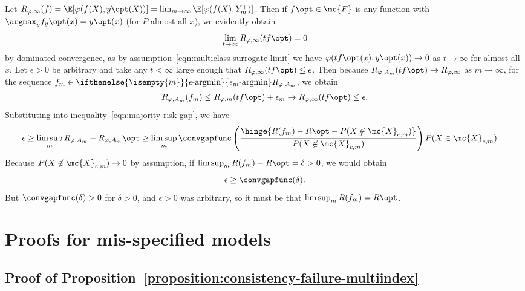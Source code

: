 \documentclass[11pt]{article}
\newcommand{\sloss}{\varphi}  %
\newcommand{\epsargmin}[1][]{
  \ifthenelse{\isempty{#1}}{%
    \mathop{\epsilon\textup{-argmin}}
  }{%
    \mathop{\epsilon_{#1}\textup{-argmin}}
  }
}
\begin{document}
Let $R_{\sloss,\infty}(f) = \E[\sloss(f(X), y\opt(X))]
= \lim_{m \to \infty} \E[\sloss(f(X), Y_m^+)]$.
%
Then if $f\opt \in \mc{F}$ is any
function with $\argmax_y f_y\opt(x) = y\opt(x)$ (for $P$-almost all $x$),
we evidently obtain
\begin{equation*}
  \lim_{t \to \infty} R_{\sloss,\infty}(t f\opt) = 0
\end{equation*}
by dominated convergence, as by
assumption~\eqref{eqn:multiclass-surrogate-limit} we have $\sloss(t
f\opt(x), y\opt(x)) \to 0$ as $t \to \infty$ for almost all $x$.
%
Let $\epsilon > 0$ be arbitrary
and take any $t < \infty$ large enough that $R_{\sloss,\infty}(t f\opt) \le
\epsilon$.
%
Then because $R_{\sloss, A_m}(t f\opt) \to R_{\sloss,\infty}$ as $m \to \infty$,
for the sequence $f_m \in \epsargmin[m] R_{\sloss,A_m}$,
we obtain
\begin{align*}
  R_{\sloss, A_m}(f_m) \le R_{\sloss,m}(t f\opt) + \epsilon_m
  \to R_{\sloss,\infty}(t f\opt) \le \epsilon.
\end{align*}
Substituting into inequality~\eqref{eqn:majority-risk-gap},
we have
\begin{align*}
  \epsilon \ge \limsup_m R_{\sloss, A_m} - R_{\sloss,A_m}\opt
  & \ge
  \limsup_m \convgapfunc\left(
  \frac{\hinge{R(f_m) - R\opt - P(X \not\in \mc{X}_{c,m})}}{P(X \not \in
    \mc{X}_{c,m})}\right)
  P(X \in \mc{X}_{c,m}).
\end{align*}
Because $P(X \not \in \mc{X}_{c,m}) \to 0$ by assumption,
if $\limsup_m R(f_m) - R\opt = \delta > 0$, we would obtain
\begin{equation*}
  \epsilon \ge \convgapfunc(\delta).
\end{equation*}
But $\convgapfunc(\delta) > 0$ for $\delta > 0$, and $\epsilon > 0$ was
arbitrary, so it must be that
$\limsup_m R(f_m) = R\opt$.


\section{Proofs for mis-specified models}

\subsection{Proof of
  Proposition~\ref{proposition:consistency-failure-multiindex}}
\label{sec:proof-consistency-failure-multiindex}

\newcommand{\sigmauni}{\sigma^{\textup{uni}}}
\end{document}
